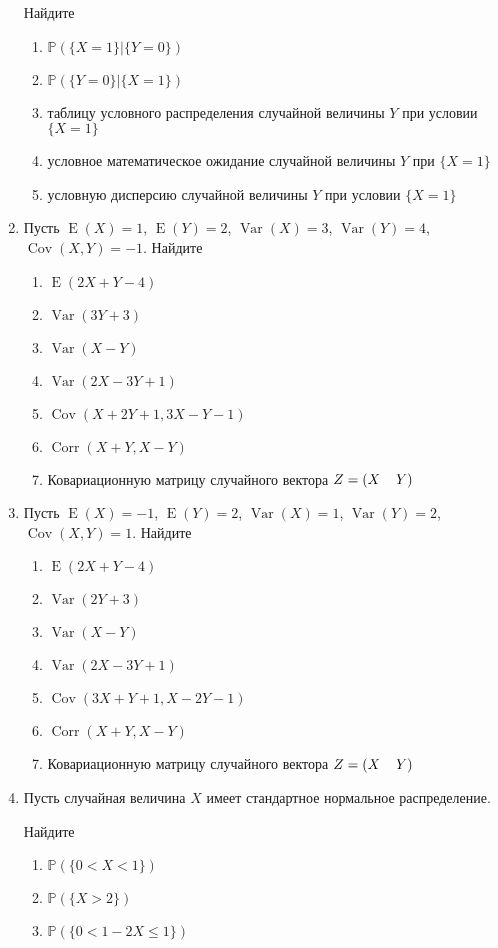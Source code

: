 \documentclass[12pt]{article}
\DeclareMathOperator{\Cov}{Cov}
\DeclareMathOperator{\Corr}{Corr}
\DeclareMathOperator{\Var}{Var}
\DeclareMathOperator{\E}{E}
\def \P{\mathbb{P}}
\begin{document}
\begin{enumerate}
Найдите
\begin{enumerate}
\item $\P(\{X = 1\} | \{Y = 0\})$
\item $\P(\{Y = 0\} | \{X = 1\})$
\item таблицу условного распределения случайной величины $Y$ при условии $\{X = 1\}$
\item условное математическое ожидание случайной величины $Y$ при $\{X = 1\}$
\item условную дисперсию случайной величины $Y$
при условии $\{X = 1\}$
\end{enumerate}

\item Пусть $\E(X)=1$, $\E(Y)=2$, $\Var(X) = 3$, $\Var(Y) = 4$, $\Cov(X,Y) = -1$. Найдите
\begin{enumerate}
\item $\E(2X + Y - 4)$
\item $\Var(3Y + 3)$
\item $\Var(X - Y)$
\item $\Var(2X - 3Y +1)$
\item $\Cov(X+ 2Y + 1,3X - Y -1)$
\item $\Corr(X + Y, X - Y)$
\item Ковариационную матрицу случайного вектора $Z = (X\hspace*{0.4cm} Y)$ \end{enumerate}


\item Пусть $\E(X)=-1$, $\E(Y)=2$, $\Var(X) = 1$, $\Var(Y) = 2$, $\Cov(X,Y) = 1$. Найдите
\begin{enumerate}
\item $\E(2X + Y - 4)$
\item $\Var(2Y + 3)$
\item $\Var(X - Y)$
\item $\Var(2X - 3Y +1)$
\item $\Cov(3X+ Y + 1,X - 2Y -1)$
\item $\Corr(X + Y, X - Y)$
\item Ковариационную матрицу случайного вектора $Z = (X\hspace*{0.4cm}Y)$
\end{enumerate}

\item Пусть случайная величина $X$ имеет стандартное нормальное распределение.

Найдите
\begin{enumerate}
\item $\P(\{0 < X < 1\})$
\item $\P(\{X > 2\})$
\item $\P(\{0 < 1 - 2X \leq 1\})$
\end{enumerate}


\end{enumerate}
\end{document}
